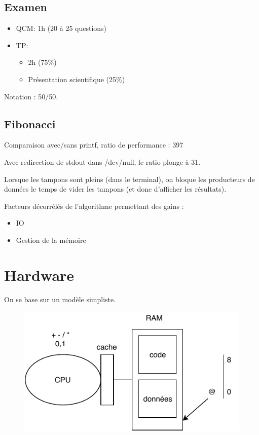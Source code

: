 \documentclass[11pt]{article}
\begin{document}
\subsection{Examen}
\begin{itemize}
    \item QCM: 1h (20 à 25 questions) \\
    \item TP: 
    \begin{itemize}
        \item 2h (75\%)
        \item Présentation scientifique (25\%)
    \end{itemize}
\end{itemize}


Notation : 50/50.

\subsection{Fibonacci}
Comparaison avec/sans printf, ratio de performance : 397

Avec redirection de stdout dans /dev/null, le ratio plonge à 31.

Lorsque les tampons sont pleins (dans le terminal), on bloque les producteurs de données le temps de vider les tampons (et donc d'afficher les résultats).

Facteurs décorrélés de l'algorithme permettant des gains :
\begin{itemize}
    \item IO
    \item Gestion de la mémoire
\end{itemize}

\section{Hardware}
On se base sur un modèle simpliste.
\begin{figure}
    \centering
    \includegraphics{img/cpu+ram.pdf}
\end{figure}
\end{document}
